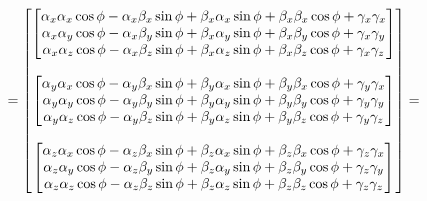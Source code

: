 \[
    =
    \begin{bmatrix}
        \begin{bmatrix}
            \alpha_x \alpha_x \cos \phi - \alpha_x \beta_x \sin \phi + \beta_x \alpha_x \sin \phi + \beta_x \beta_x \cos \phi + \gamma_x \gamma_x \\
            \alpha_x \alpha_y \cos \phi - \alpha_x \beta_y \sin \phi + \beta_x \alpha_y \sin \phi + \beta_x \beta_y \cos \phi + \gamma_x \gamma_y \\
            \alpha_x \alpha_z \cos \phi - \alpha_x \beta_z \sin \phi + \beta_x \alpha_z \sin \phi + \beta_x \beta_z \cos \phi + \gamma_x \gamma_z \\
        \end{bmatrix} \\ \\
        \begin{bmatrix}
            \alpha_y \alpha_x \cos \phi - \alpha_y \beta_x \sin \phi + \beta_y \alpha_x \sin \phi + \beta_y \beta_x \cos \phi + \gamma_y \gamma_x \\
            \alpha_y \alpha_y \cos \phi - \alpha_y \beta_y \sin \phi + \beta_y \alpha_y \sin \phi + \beta_y \beta_y \cos \phi + \gamma_y \gamma_y \\
            \alpha_y \alpha_z \cos \phi - \alpha_y \beta_z \sin \phi + \beta_y \alpha_z \sin \phi + \beta_y \beta_z \cos \phi + \gamma_y \gamma_z \\
        \end{bmatrix} \\ \\
        \begin{bmatrix}
            \alpha_z \alpha_x \cos \phi - \alpha_z \beta_x \sin \phi + \beta_z \alpha_x \sin \phi + \beta_z \beta_x \cos \phi + \gamma_z \gamma_x \\
            \alpha_z \alpha_y \cos \phi - \alpha_z \beta_y \sin \phi + \beta_z \alpha_y \sin \phi + \beta_z \beta_y \cos \phi + \gamma_z \gamma_y \\
            \alpha_z \alpha_z \cos \phi - \alpha_z \beta_z \sin \phi + \beta_z \alpha_z \sin \phi + \beta_z \beta_z \cos \phi + \gamma_z \gamma_z \\
        \end{bmatrix} \\
    \end{bmatrix} =
\]
